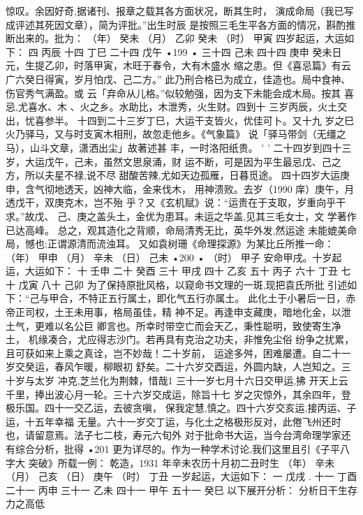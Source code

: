 惊叹。余因好奇,据诸刊、报章之载其各方面状况，断其生时，
演成命局（我已写成评述其死因文章），简为评批。”出生时辰
是按照三毛生平各方面的情况，斟酌推断出来的。批为：
（年） 癸未
（月） 乙卯
癸未
（时） 甲寅
四岁起运，大运如下：
四 丙辰
十四 丁巳
二十四 戊午
•199 •
三十四 己未
四十四 庚申
癸未日元，生提乙卯，时落甲寅，木旺于春令，大有木盛水
缩之患。但《喜忌篇》有云广六癸日得寅，岁月怕戊、己二方。”
此乃刑合格已为成立，佳造也。局中食神、伤官秀气满盈。或
云「弃命从儿格。”似较勉强，因为支下未能会成木局。按其
喜忌,尤喜水、木 、火之乡。水助比，木泄秀，火生财。四到十
三岁丙辰，火土交出，忧喜参半。
十四到二十三岁丁巳，大运干支皆火，优佳可卜。又十九
岁之巳火乃驿马，又与时支寅木相刑，故忽走他乡。《气象篇》
说「驿马带剑（无缰之马），山斗文章，潇洒出尘」故著述甚
丰，一时洛阳纸贵。 ’
'
二十四岁到四十三岁，大运戊午，己未，虽然文思泉涌，财
运不断，可是因为平生最忌戊、己之方，所以夫星不禄,说不尽
甜酸苦辣,尤如天边孤雁，日暮觅途。
四十四岁大运庚申，含气彻地透天，凶神大临，金来伐木，
用神溃败。去岁（1990 庠）庚午，月透戊干，双庚克木，岂不殆
乎？又《玄机赋》说：“运贵在于支取，岁重向乎干求。”故戊、
己、庚之盖头土，金优为患耳。未运之华盖,见其三毛女士，文
学著作已达高峰。
总之，观其造化之背顺，命局清秀无比，英华外发,然运途
未能媲美命局，憾也;正谓源清而流浊耳。
又如袁树珊《命理探源》为某比丘所推一命：
（年） 甲申
（月） 辛未
（日） 己未
•200 •
（时） 甲子
安命甲戌。十岁起运，大运如下：
十 壬申
二十 癸酉
三十 甲戌
四十 乙亥
五十 丙子
六十 丁丑
七十 戊寅
八十 己卯
为了保持原批风格，以窥命书文理的一斑,现把袁氏所批
引述如下：“己与甲合，不特正五行属土，即化气五行亦属土。
此化土于小暑后一日，赤帝正司权，土王未用事，格局虽佳，精
神不足。再逢申支藏庚，暗地化金，以泄土气，更难以名公巨
卿言也。所幸时带空亡而会天乙，秉性聪明，致使寄生净土，
机缘凑合，尤应得志沙门。若再具有克治之功夫，非惟免尘俗
纷争之扰累，且可获如来上乘之真诠，岂不妙哉！二十岁前，
运途多舛，困难屡遭。自二十一岁交癸运，春风乍暖，柳眼初
舒矣。二十六岁交酉运，外圆内缺，人岂知之。三十岁与太岁
冲克,芝兰化为荆棘，惜哉1 三十一岁七月十六日交甲运,拂
开天上云千里，捧出波心月一轮。三十六岁交成运，除旨十七
岁之灾惊外，其余四年，登极乐国。四十一交乙运，去彼贪嗔，
保我定慧,慎之。四十六岁交亥运,接丙运、子运，十五年幸福
无量。六十一岁交丁运，与化土之格极形反对，此倦飞州还时
也，请留意焉。法子七二枝，寿元六旬外
对于批命书大运，当今台湾命理学家还有综合分析，批得
•201
更为详尽的。作为一种学术讨论,我们这里且引《子平八字大
突破》所载一例：
乾造，1931 年辛未农历十月初二丑时生
（年） 辛未
（月） 己亥
（日） 庚午
（时） 丁丑
一岁起运，大运如下：
一 戊戌 .
十一 丁酉
二十一 丙申
三十一 乙未
四十一 甲午
五十一 癸巳
以下展开分析：
分析日干生存力之高低
